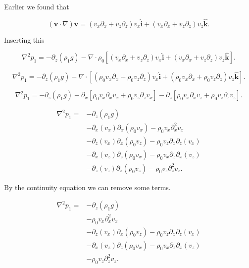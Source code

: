 \documentclass{article}
\begin{document}
Earlier we found that 

\begin{equation}
    (\mathbf{v}\cdot\nabla)\mathbf{v} = (v_x\partial_x+ v_z\partial_z)v_x\mathbf{\hat{i}}+(v_x\partial_x+ v_z\partial_z)v_z\mathbf{\hat{k}}.
\end{equation}

Inserting this

\begin{equation}
    \nabla^2 p_1= - \partial_z\left(\rho_1 g\right) - \nabla\cdot\rho_0\left[(v_x\partial_x+ v_z\partial_z)v_x\mathbf{\hat{i}}+(v_x\partial_x+ v_z\partial_z)v_z\mathbf{\hat{k}} \right].
\end{equation}

\begin{equation}
    \nabla^2 p_1= - \partial_z\left(\rho_1 g\right) - \nabla\cdot\left[(\rho_0v_x\partial_x+ \rho_0v_z\partial_z)v_x\mathbf{\hat{i}}+(\rho_0v_x\partial_x+ \rho_0v_z\partial_z)v_z\mathbf{\hat{k}} \right].
\end{equation}

\begin{equation}
    \nabla^2 p_1= - \partial_z\left(\rho_1 g\right) - \partial_x\left[\rho_0v_x\partial_xv_x+ \rho_0v_z\partial_zv_x\right]-\partial_z\left[\rho_0v_x\partial_xv_z + \rho_0v_z\partial_zv_z \right].
\end{equation}

\begin{align*}
    \nabla^2 p_1 = &- \partial_z\left(\rho_1 g\right) \\
    &-\partial_x(v_x)\partial_x(\rho_0v_x)-\rho_0v_x\partial^2_x v_x\\
    &-\partial_z(v_x)\partial_x(\rho_0v_z)-\rho_0v_z \partial_x\partial_z(v_x)\\
    &-\partial_x(v_z)\partial_z(\rho_0v_x)-\rho_0v_x\partial_z\partial_x(v_z)\\
    &-\partial_z(v_z)\partial_z(\rho_0v_z)-\rho_0v_z\partial^2_z v_z.
\end{align*}

By the continuity equation we can remove some terms.

\begin{align*}
    \nabla^2 p_1 = &- \partial_z\left(\rho_1 g\right) \\
    &-\rho_0v_x\partial^2_x v_x\\
    &-\partial_z(v_x)\partial_x(\rho_0v_z)-\rho_0v_z \partial_x\partial_z(v_x)\\
    &-\partial_x(v_z)\partial_z(\rho_0v_x)-\rho_0v_x\partial_z\partial_x(v_z)\\
    &-\rho_0v_z\partial^2_z v_z.
\end{align*}
\end{document}
